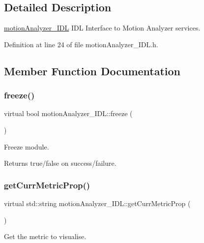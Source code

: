 \subsection{Detailed Description}
\mbox{\hyperlink{classmotionAnalyzer__IDL}{motion\+Analyzer\+\_\+\+I\+DL}} I\+DL Interface to Motion Analyzer services. 

Definition at line 24 of file motion\+Analyzer\+\_\+\+I\+D\+L.\+h.



\subsection{Member Function Documentation}
\mbox{\label{classmotionAnalyzer__IDL_a5eb19773188b6a025e74a3ba35bc623d}} 
\subsubsection{\texorpdfstring{freeze()}{freeze()}}
{\footnotesize\ttfamily virtual bool motion\+Analyzer\+\_\+\+I\+D\+L\+::freeze (\begin{DoxyParamCaption}{ }\end{DoxyParamCaption})\hspace{0.3cm}{\ttfamily [virtual]}}



Freeze module. 

\begin{DoxyReturn}{Returns}
true/false on success/failure. 
\end{DoxyReturn}
\mbox{\label{classmotionAnalyzer__IDL_a2caac2fd16a9abd91b59615dbb717c88}} 
\subsubsection{\texorpdfstring{getCurrMetricProp()}{getCurrMetricProp()}}
{\footnotesize\ttfamily virtual std\+::string motion\+Analyzer\+\_\+\+I\+D\+L\+::get\+Curr\+Metric\+Prop (\begin{DoxyParamCaption}{ }\end{DoxyParamCaption})\hspace{0.3cm}{\ttfamily [virtual]}}



Get the metric to visualise. 

